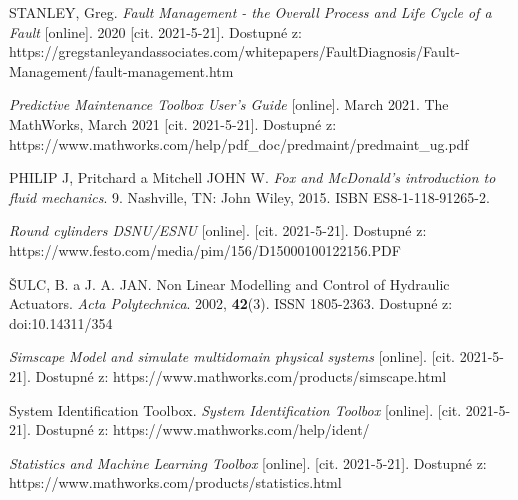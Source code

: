\begin{thebibliography}{14}
 STANLEY, Greg. \textit{Fault Management - the
Overall Process and Life Cycle of a Fault} [online]. 2020 [cit. 2021-5-21].
Dostupné z:
https://gregstanleyandassociates.com/whitepapers/FaultDiagnosis/Fault-Management/fault-management.htm



 \textit{Predictive Maintenance Toolbox User's Guide}
[online]. March 2021. The MathWorks, March 2021 [cit. 2021-5-21]. Dostupné
z: https://www.mathworks.com/help/pdf\_doc/predmaint/predmaint\_ug.pdf


 PHILIP J, Pritchard a Mitchell JOHN W. \textit{Fox and
McDonald's introduction to fluid mechanics}. 9. Nashville, TN: John Wiley,
2015. ISBN ES8-1-118-91265-2.

 \textit{Round cylinders DSNU/ESNU} [online].
[cit. 2021-5-21]. Dostupné z:
https://www.festo.com/media/pim/156/D15000100122156.PDF


 ŠULC, B. a J. A. JAN. Non Linear Modelling and
Control of Hydraulic Actuators. \textit{Acta Polytechnica}. 2002,
\textbf{42}(3). ISSN 1805-2363. Dostupné z: doi:10.14311/354



 \textit{Simscape Model and simulate multidomain physical
systems} [online]. [cit. 2021-5-21]. Dostupné z:
https://www.mathworks.com/products/simscape.html


 System Identification Toolbox. \textit{System
Identification Toolbox} [online]. [cit. 2021-5-21]. Dostupné z:
https://www.mathworks.com/help/ident/


 \textit{Statistics and Machine Learning Toolbox} [online].
[cit. 2021-5-21]. Dostupné z:
https://www.mathworks.com/products/statistics.html




\end{thebibliography}

